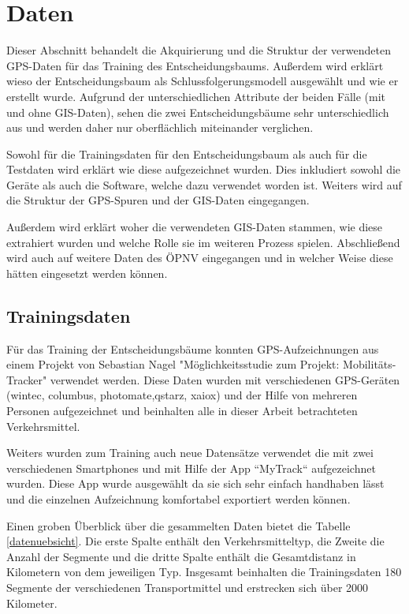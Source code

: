 \chapter{Daten}
Dieser Abschnitt behandelt die Akquirierung und die Struktur der verwendeten GPS-Daten für das Training des Entscheidungsbaums. Außerdem wird erklärt wieso der Entscheidungsbaum als Schlussfolgerungsmodell ausgewählt und wie er erstellt wurde. Aufgrund der unterschiedlichen Attribute  der beiden Fälle (mit und ohne GIS-Daten), sehen die zwei Entscheidungsbäume sehr unterschiedlich aus und werden daher nur oberflächlich miteinander verglichen.

Sowohl für die Trainingsdaten für den Entscheidungsbaum als auch für die Testdaten wird erklärt wie diese aufgezeichnet wurden. Dies inkludiert sowohl die Geräte als auch die Software, welche dazu verwendet worden ist. Weiters wird auf die Struktur der GPS-Spuren und der GIS-Daten eingegangen.

Außerdem wird erklärt woher die verwendeten GIS-Daten stammen, wie diese extrahiert wurden und welche Rolle sie im weiteren Prozess spielen. Abschließend wird auch auf weitere Daten des ÖPNV eingegangen und in welcher Weise diese hätten eingesetzt werden können.

\section{Trainingsdaten}
\label{sec:trainingdata}
Für das Training der Entscheidungsbäume konnten GPS-Aufzeichnungen aus einem Projekt von Sebastian Nagel "Möglichkeitsstudie zum Projekt: Mobilitäts-Tracker" verwendet werden. Diese Daten wurden mit verschiedenen GPS-Geräten (wintec, columbus, photomate,qstarz, xaiox) und der Hilfe von mehreren Personen aufgezeichnet und beinhalten alle in dieser Arbeit betrachteten Verkehrsmittel. \cite{sebastian_nagel_moglichkeitsstudie_2011}

Weiters wurden zum Training auch neue Datensätze verwendet die mit zwei verschiedenen Smartphones und mit Hilfe der App ``MyTrack`` aufgezeichnet wurden. Diese App wurde ausgewählt da sie sich sehr einfach handhaben lässt und die einzelnen Aufzeichnung komfortabel exportiert werden können. 

Einen groben Überblick über die gesammelten Daten bietet die Tabelle \ref{datenuebsicht}. Die erste Spalte enthält den Verkehrsmitteltyp, die Zweite die Anzahl der Segmente  und die dritte Spalte enthält die Gesamtdistanz in Kilometern von dem jeweiligen Typ. Insgesamt beinhalten die Trainingsdaten 180 Segmente der verschiedenen Transportmittel und erstrecken sich über 2000 Kilometer.

